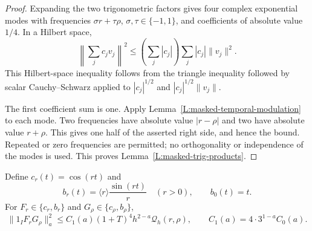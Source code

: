 \begin{proof}
  Expanding the two trigonometric factors gives four complex exponential modes
  with frequencies $\sigma r+\tau\rho$, $\sigma,\tau \in \{-1,1\}$, and
  coefficients of absolute value $1/4$. In a Hilbert space,
  \[
    \left\|\sum_j c_jv_j\right\|^2
    \le \left(\sum_j|c_j|\right)\sum_j|c_j|\|v_j\|^2.
  \]
  This Hilbert-space inequality follows from the triangle inequality followed
  by scalar Cauchy--Schwarz applied to $|c_j|^{1/2}$ and $|c_j|^{1/2}\|v_j\|$.

  The first coefficient sum is one. Apply
  Lemma~\ref{L:masked-temporal-modulation} to each mode. Two frequencies have
  absolute value $|r-\rho|$ and two have absolute value $r+\rho$. This gives one
  half of the asserted right side, and hence the bound. Repeated or zero
  frequencies are permitted; no orthogonality or independence of the modes is
  used. This proves Lemma~\ref{L:masked-trig-products}.
\end{proof}

\begin{lemma}\label{L:masked-continuous-wave}
  Define $c_r(t) = \cos(rt)$ and
  \[
    b_r(t) = \langle r\rangle\frac{\sin(rt)}r\quad(r > 0),
    \qquad b_0(t) = t.
  \]
  For $F_r \in \{c_r,b_r\}$ and $G_\rho \in \{c_\rho,b_\rho\}$,
  \begin{equation}\label{E:masked-continuous-wave}
    \|1_IF_rG_\rho\|_a^2
    \le C_1(a)(1+T)^4h^{2-a}\mathcal{Q}_h(r,\rho),
    \qquad C_1(a) = 4\cdot3^{1-a}C_0(a).
  \end{equation}
\end{lemma}

